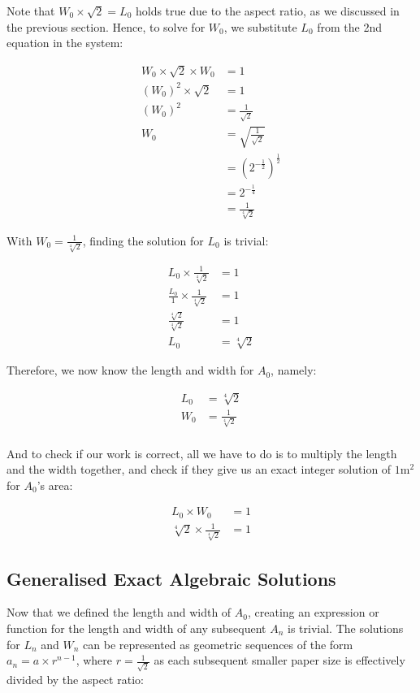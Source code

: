 \noindent
Note that $W_0 \times \sqrt{2} = L_0$ holds true due to the aspect ratio, as we discussed in the previous section. Hence, to solve for $W_0$, we substitute $L_0$ from the 2nd equation in the system:

\begin{align*}
  W_0 \times \sqrt{2} \times W_0 &= 1 \\
  \left(W_0\right)^2 \times \sqrt{2} &=1 \\
  \left(W_0\right)^2 &= \frac{1}{\sqrt{2}} \\
  W_0 &= \sqrt{\frac{1}{\sqrt{2}}} \\
  &= \left(2^{-\frac{1}{2}}\right)^{\frac{1}{2}} \\
  &= 2^{-\frac{1}{4}} \\
  &= \frac{1}{\sqrt[4]{2}}
\end{align*}

\noindent
With $W_0 = \frac{1}{\sqrt[4]{2}}$, finding the solution for $L_0$ is trivial:

\begin{align*}
  L_0 \times \frac{1}{\sqrt[4]{2}} &= 1 \\
  \frac{L_0}{1} \times \frac{1}{\sqrt[4]{2}} &= 1 \\
  \frac{\sqrt[4]{2}}{\sqrt[4]{2}} &= 1 \\
  L_0 &= \sqrt[4]{2}
\end{align*}

\noindent
Therefore, we now know the length and width for $A_0$, namely:

\begin{align*}
  L_0 &= \sqrt[4]{2} \\
  W_0 &= \frac{1}{\sqrt[4]{2}} \\
\end{align*}

\noindent
And to check if our work is correct, all we have to do is to multiply the length and the width together, and check if they give us an exact integer solution of $1\si{\meter\squared}$ for $A_0$'s area:

\begin{align*}
  L_0 \times W_0 &= 1 \\
  \sqrt[4]{2} \times \frac{1}{\sqrt[4]{2}} &= 1
\end{align*}

\subsection*{Generalised Exact Algebraic Solutions}
Now that we defined the length and width of $A_0$, creating an expression or function for the length and width of any subsequent $A_n$ is trivial. The solutions for $L_n$ and $W_n$ can be represented as geometric sequences of the form $a_{n} = a \times r^{n - 1}$, where $r = \frac{1}{\sqrt{2}}$ as each subsequent smaller paper size is effectively divided by the aspect ratio:

